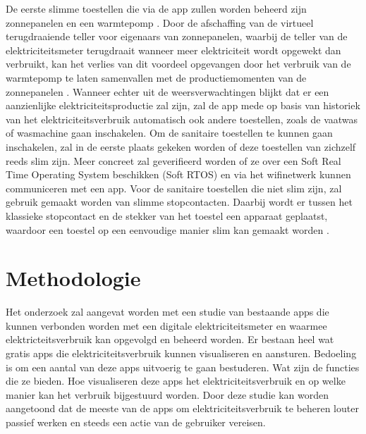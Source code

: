 \documentclass{hogent-article}
\begin{document}
De eerste slimme toestellen die via de app zullen worden beheerd zijn zonnepanelen en een warmtepomp \autocite{Uytterhoeven2019}. Door de afschaffing van de virtueel terugdraaiende teller voor eigenaars van zonnepanelen, waarbij de teller van de elektriciteitsmeter terugdraait wanneer meer elektriciteit wordt opgewekt dan verbruikt, kan het verlies van dit voordeel opgevangen door het verbruik van de warmtepomp te laten samenvallen met de productiemomenten van de zonnepanelen \autocite{Selleslagh2021}. Wanneer echter uit de weersverwachtingen blijkt dat er een aanzienlijke elektriciteitsproductie zal zijn, zal de app  mede op basis van historiek van het elektriciteitsverbruik automatisch ook andere toestellen, zoals de vaatwas of wasmachine gaan inschakelen. Om de sanitaire toestellen te kunnen gaan inschakelen, zal in de eerste plaats gekeken worden of deze toestellen van zichzelf reeds slim zijn. Meer concreet zal geverifieerd worden of ze over een Soft Real Time Operating System beschikken (Soft RTOS) en via het wifinetwerk kunnen communiceren met een app. Voor de sanitaire toestellen die niet slim zijn, zal gebruik gemaakt worden van slimme stopcontacten. Daarbij wordt er tussen het klassieke stopcontact en de stekker van het toestel een apparaat geplaatst, waardoor een toestel op een eenvoudige manier slim kan gemaakt worden \autocite{Jong2020}.

\newpage \pagebreak \cleardoublepage
\section{Methodologie}%
\label{sec:methodologie}

Het onderzoek zal aangevat worden met een studie van bestaande apps die kunnen verbonden worden met een digitale elektriciteitsmeter en waarmee elektricteitsverbruik kan opgevolgd en beheerd worden. Er bestaan heel wat gratis apps die elektriciteitsverbruik kunnen visualiseren en aansturen. Bedoeling is om een aantal van deze apps uitvoerig te gaan bestuderen. Wat zijn de functies die ze bieden. Hoe visualiseren deze apps het elektriciteitsverbruik en op welke manier kan het verbruik bijgestuurd worden. Door deze studie kan worden aangetoond dat de meeste van de apps om elektriciteitsverbruik te beheren louter passief werken en steeds een actie van de gebruiker vereisen. \\
\end{document}

